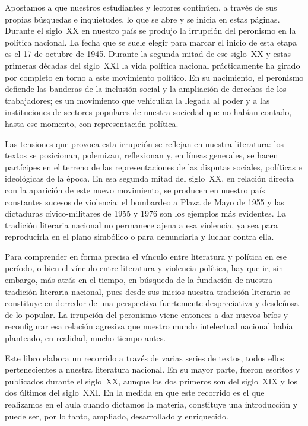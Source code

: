 Apostamos a que nuestros estudiantes y lectores continúen, a través de sus propias búsquedas e inquietudes, lo que se abre y se inicia en estas páginas. Durante el siglo~XX en nuestro país se produjo la irrupción del peronismo en la política nacional. La fecha que se suele elegir para marcar el inicio de esta etapa es el 17 de octubre de 1945. Durante la segunda mitad de ese siglo~XX y estas primeras décadas del siglo~XXI la vida política nacional prácticamente ha girado por completo en torno a este movimiento político. En su nacimiento, el peronismo defiende las banderas de la inclusión social y la ampliación de derechos de los trabajadores; es un movimiento que vehiculiza la llegada al poder y a las instituciones de sectores populares de nuestra sociedad que no habían contado, hasta ese momento, con representación política.

Las tensiones que provoca esta irrupción se reflejan en nuestra literatura: los textos se posicionan, polemizan, reflexionan y, en líneas generales, se hacen partícipes en el terreno de las representaciones de las disputas sociales, políticas e ideológicas de la época. En esa segunda mitad del siglo~XX, en relación directa con la aparición de este nuevo movimiento, se producen en nuestro país constantes sucesos de violencia: el bombardeo a Plaza de Mayo de 1955 y las dictaduras cívico-militares de 1955 y 1976 son los ejemplos más evidentes. La tradición literaria nacional no permanece ajena a esa violencia, ya sea para reproducirla en el plano simbólico o para denunciarla y luchar contra ella.

Para comprender en forma precisa el vínculo entre literatura y política en ese período, o bien el vínculo entre literatura y violencia política, hay que ir, sin embargo, más atrás en el tiempo, en búsqueda de la fundación de nuestra tradición literaria nacional, pues desde sus inicios nuestra tradición literaria se constituye en derredor de una perspectiva fuertemente despreciativa y desdeñosa de lo popular. La irrupción del peronismo viene entonces a dar nuevos bríos y reconfigurar esa relación agresiva que nuestro mundo intelectual nacional había planteado, en realidad, mucho tiempo antes.

Este libro elabora un recorrido a través de varias series de textos, todos ellos pertenecientes a nuestra literatura nacional. En su mayor parte, fueron escritos y publicados durante el siglo~XX, aunque los dos primeros son del siglo~XIX y los dos últimos del siglo~XXI. En la medida en que este recorrido es el que realizamos en el aula cuando dictamos la materia, constituye una introducción y puede ser, por lo tanto, ampliado, desarrollado y enriquecido.


